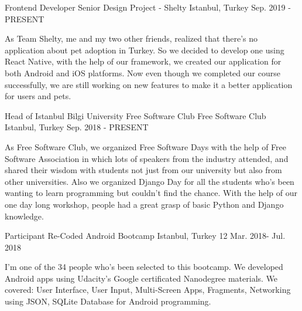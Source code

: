 


\begin{cventries}


\cventry
{Frontend Developer} %
{Senior Design Project - Shelty} %
{Istanbul, Turkey} %
{Sep. 2019 - PRESENT} %
{ %
\begin{cvitems}
\item {As Team Shelty, me and my two other friends, realized that there's no application about pet adoption in Turkey. So we decided to develop one using React Native, with the help of our framework, we created our application for both Android and iOS platforms. Now even though we completed our course successfully, we are still working on new features to make it a better application for users and pets.}
\end{cvitems}
}


\cventry
{Head of Istanbul Bilgi University Free Software Club} %
{Free Software Club} %
{Istanbul, Turkey} %
{Sep. 2018 - PRESENT} %
{ %
\begin{cvitems}
\item {As Free Software Club, we organized Free Software Days with the help of Free Software Association in which lots of speakers from the industry attended, and shared their wisdom with students not just from our university but also from other universities. Also we organized Django Day for all the students who's been wanting to learn programming but couldn't find the chance. With the help of our one day long workshop, people had a great grasp of basic Python and Django knowledge. }
\end{cvitems}
}


\cventry
{Participant} %
{Re-Coded Android Bootcamp} %
{Istanbul, Turkey} %
{12 Mar. 2018- Jul. 2018} %
{ %
\begin{cvitems}
\item {I'm one of the 34 people who's been selected to this bootcamp. We developed Android apps using Udacity's Google certificated Nanodegree materials. We covered: User Interface, User Input, Multi-Screen Apps, Fragments, Networking using JSON, SQLite Database for Android programming.}
\end{cvitems}
}



\end{cventries}
